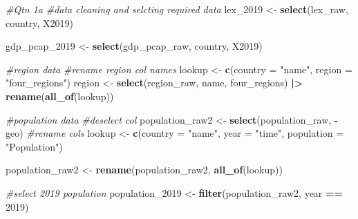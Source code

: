 \documentclass[
]{article}
\newenvironment{Shaded}{\begin{snugshade}}{\end{snugshade}}
\newcommand{\AttributeTok}[1]{\textcolor[rgb]{0.13,0.29,0.53}{#1}}
\newcommand{\CommentTok}[1]{\textcolor[rgb]{0.56,0.35,0.01}{\textit{#1}}}
\newcommand{\DecValTok}[1]{\textcolor[rgb]{0.00,0.00,0.81}{#1}}
\newcommand{\FunctionTok}[1]{\textcolor[rgb]{0.13,0.29,0.53}{\textbf{#1}}}
\newcommand{\NormalTok}[1]{#1}
\newcommand{\OtherTok}[1]{\textcolor[rgb]{0.56,0.35,0.01}{#1}}
\newcommand{\SpecialCharTok}[1]{\textcolor[rgb]{0.81,0.36,0.00}{\textbf{#1}}}
\newcommand{\StringTok}[1]{\textcolor[rgb]{0.31,0.60,0.02}{#1}}
\begin{document}
\begin{Shaded}
\begin{Highlighting}[]
\CommentTok{\#Qtn 1a}
\CommentTok{\#data cleaning and selcting required data}
\NormalTok{lex\_2019 }\OtherTok{\textless{}{-}} \FunctionTok{select}\NormalTok{(lex\_raw, country, X2019)}

\NormalTok{gdp\_pcap\_2019 }\OtherTok{\textless{}{-}} \FunctionTok{select}\NormalTok{(gdp\_pcap\_raw, country, X2019)}

\CommentTok{\#region data}
\CommentTok{\#rename region col names}
\NormalTok{lookup }\OtherTok{\textless{}{-}} \FunctionTok{c}\NormalTok{(}\AttributeTok{country =} \StringTok{"name"}\NormalTok{,}
            \AttributeTok{region =} \StringTok{"four\_regions"}\NormalTok{)}
\NormalTok{region }\OtherTok{\textless{}{-}} \FunctionTok{select}\NormalTok{(region\_raw, name, four\_regions) }\SpecialCharTok{|\textgreater{}} \FunctionTok{rename}\NormalTok{(}\FunctionTok{all\_of}\NormalTok{(lookup))}


\CommentTok{\#population data}
\CommentTok{\#deselect col}
\NormalTok{population\_raw2 }\OtherTok{\textless{}{-}} \FunctionTok{select}\NormalTok{(population\_raw, }\SpecialCharTok{{-}}\NormalTok{geo)}
\CommentTok{\#rename cols}
\NormalTok{lookup }\OtherTok{\textless{}{-}} \FunctionTok{c}\NormalTok{(}\AttributeTok{country =} \StringTok{"name"}\NormalTok{,}
            \AttributeTok{year =} \StringTok{"time"}\NormalTok{,}
            \AttributeTok{population =} \StringTok{"Population"}\NormalTok{)}

\NormalTok{population\_raw2 }\OtherTok{\textless{}{-}} \FunctionTok{rename}\NormalTok{(population\_raw2, }\FunctionTok{all\_of}\NormalTok{(lookup))}

\CommentTok{\#select 2019 population}
\NormalTok{population\_2019 }\OtherTok{\textless{}{-}} \FunctionTok{filter}\NormalTok{(population\_raw2, year }\SpecialCharTok{==} \DecValTok{2019}\NormalTok{)}
\end{Highlighting}
\end{Shaded}
\end{document}
